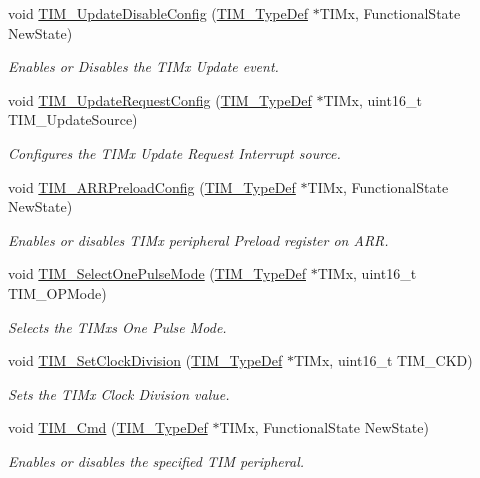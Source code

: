 \begin{DoxyCompactItemize}
void \hyperlink{group___t_i_m___group1_gace2384dd33e849a054f61b8e1fc7e7c3}{T\+I\+M\+\_\+\+Update\+Disable\+Config} (\hyperlink{struct_t_i_m___type_def}{T\+I\+M\+\_\+\+Type\+Def} $\ast$T\+I\+Mx, Functional\+State New\+State)
\begin{DoxyCompactList}\small\item\em Enables or Disables the T\+I\+Mx Update event. \end{DoxyCompactList}\item 
void \hyperlink{group___t_i_m___group1_ga1d7a8f952e209de142499e67a653fc1f}{T\+I\+M\+\_\+\+Update\+Request\+Config} (\hyperlink{struct_t_i_m___type_def}{T\+I\+M\+\_\+\+Type\+Def} $\ast$T\+I\+Mx, uint16\+\_\+t T\+I\+M\+\_\+\+Update\+Source)
\begin{DoxyCompactList}\small\item\em Configures the T\+I\+Mx Update Request Interrupt source. \end{DoxyCompactList}\item 
void \hyperlink{group___t_i_m___group1_ga42b44b9fc2b0798d733720dd6bac1ac0}{T\+I\+M\+\_\+\+A\+R\+R\+Preload\+Config} (\hyperlink{struct_t_i_m___type_def}{T\+I\+M\+\_\+\+Type\+Def} $\ast$T\+I\+Mx, Functional\+State New\+State)
\begin{DoxyCompactList}\small\item\em Enables or disables T\+I\+Mx peripheral Preload register on A\+RR. \end{DoxyCompactList}\item 
void \hyperlink{group___t_i_m___group1_gadd2cca5fac6c1291dc4339098d5c9562}{T\+I\+M\+\_\+\+Select\+One\+Pulse\+Mode} (\hyperlink{struct_t_i_m___type_def}{T\+I\+M\+\_\+\+Type\+Def} $\ast$T\+I\+Mx, uint16\+\_\+t T\+I\+M\+\_\+\+O\+P\+Mode)
\begin{DoxyCompactList}\small\item\em Selects the T\+I\+Mx\textquotesingle{}s One Pulse Mode. \end{DoxyCompactList}\item 
void \hyperlink{group___t_i_m___group1_ga20ef804dc32c723662d11ee7da3baab2}{T\+I\+M\+\_\+\+Set\+Clock\+Division} (\hyperlink{struct_t_i_m___type_def}{T\+I\+M\+\_\+\+Type\+Def} $\ast$T\+I\+Mx, uint16\+\_\+t T\+I\+M\+\_\+\+C\+KD)
\begin{DoxyCompactList}\small\item\em Sets the T\+I\+Mx Clock Division value. \end{DoxyCompactList}\item 
void \hyperlink{group___t_i_m___group1_ga2bdc275bcbd2ce9d1ba632e6c89896b7}{T\+I\+M\+\_\+\+Cmd} (\hyperlink{struct_t_i_m___type_def}{T\+I\+M\+\_\+\+Type\+Def} $\ast$T\+I\+Mx, Functional\+State New\+State)
\begin{DoxyCompactList}\small\item\em Enables or disables the specified T\+IM peripheral. \end{DoxyCompactList}\end{DoxyCompactItemize}


